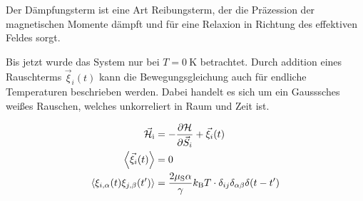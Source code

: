 \documentclass[main.tex]{subfiles}
\begin{document}
Der Dämpfungsterm ist eine Art Reibungsterm, der die Präzession der
magnetischen Momente dämpft und für eine Relaxion in Richtung des effektiven
Feldes sorgt.

Bis jetzt wurde das System nur bei \(T = \SI{0}{\kelvin}\) betrachtet.
Durch addition eines Rauschterms \(\vec{\xi}_i(t)\) kann die Bewegungsgleichung
auch für endliche Temperaturen beschrieben werden.
Dabei handelt es sich um ein Gausssches weißes Rauschen, welches unkorreliert
in Raum und Zeit ist.

\begin{align}
	\vec{\mathcal{H}}_{\text{i}}                 & =
	-\pdv{\mathcal{H}}{\vec{S}_i} +
	\vec{\xi}_i(t)
	\\
	\expval{\vec{\xi}_i(t)}                      & = 0
	\\
	\expval{\xi_{i,\alpha}(t) \xi_{j,\beta}(t')} & = \frac{2\mu_\text{S}
		\alpha
	}{\gamma}k_\text{B} T \cdot \delta_{ij} \delta_{\alpha \beta}
	\delta(t-t')
\end{align}
\end{document}
